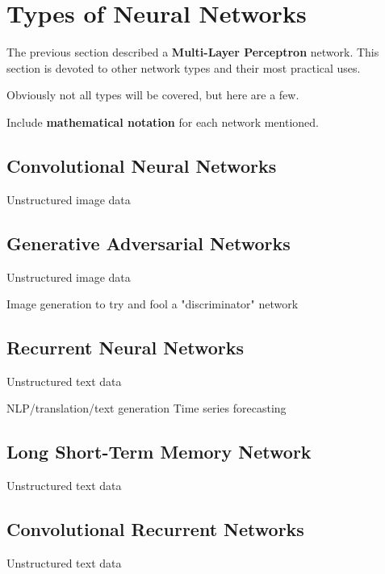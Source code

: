 \section{Types of Neural Networks} %
The previous section described a \textbf{Multi-Layer Perceptron} network.  This section is devoted to other network types and their most practical uses.


Obviously not all types will be covered, but here are a few.  

Include \textbf{mathematical notation} for each network mentioned.


\subsection{Convolutional Neural Networks}
Unstructured image data

\subsection{Generative Adversarial Networks}
Unstructured image data

Image generation to try and fool a "discriminator" network

\subsection{Recurrent Neural Networks}
Unstructured text data

NLP/translation/text generation
Time series forecasting

\subsection{Long Short-Term Memory Network}
Unstructured text data

\subsection{Convolutional Recurrent Networks}
Unstructured text data

